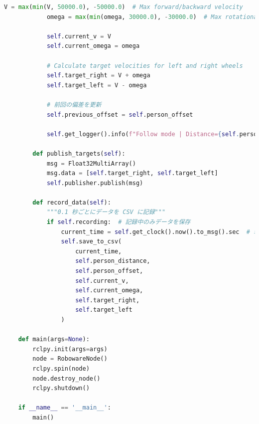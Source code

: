 \begin{lstlisting}[language=Python, caption=Roboware\_node.py]
            V = max(min(V, 50000.0), -50000.0)  # Max forward/backward velocity
            omega = max(min(omega, 30000.0), -30000.0)  # Max rotational velocity
    
            self.current_v = V
            self.current_omega = omega
    
            # Calculate target velocities for left and right wheels
            self.target_right = V + omega
            self.target_left = V - omega
    
            # 前回の偏差を更新
            self.previous_offset = self.person_offset
    
            self.get_logger().info(f"Follow mode | Distance={self.person_distance}, Offset={self.person_offset}, OffsetRate={offset_rate} | Kd={dynamic_kd:.2f} | V={V}, Omega={omega} | Target Right={self.target_right}, Left={self.target_left}")
    
        def publish_targets(self):
            msg = Float32MultiArray()
            msg.data = [self.target_right, self.target_left]
            self.publisher.publish(msg)
    
        def record_data(self):
            """0.1 秒ごとにデータを CSV に記録"""
            if self.recording:  # 記録中のみデータを保存
                current_time = self.get_clock().now().to_msg().sec  # 現在時刻を秒単位で取得
                self.save_to_csv(
                    current_time, 
                    self.person_distance, 
                    self.person_offset, 
                    self.current_v, 
                    self.current_omega, 
                    self.target_right, 
                    self.target_left
                )
    
    def main(args=None):
        rclpy.init(args=args)
        node = RobowareNode()
        rclpy.spin(node)
        node.destroy_node()
        rclpy.shutdown()
    
    if __name__ == '__main__':
        main()
\end{lstlisting}


